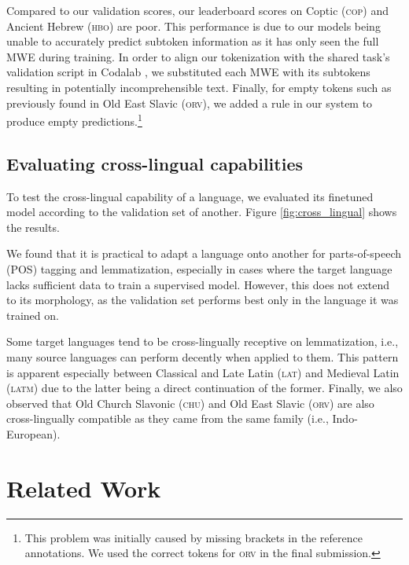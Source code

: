 \documentclass[11pt]{article}
\begin{document}
Compared to our validation scores, our leaderboard scores on Coptic (\textsc{cop}) and Ancient Hebrew (\textsc{hbo}) are poor.
This performance is due to our models being unable to accurately predict subtoken information as it has only seen the full MWE during training.
In order to align our tokenization with the shared task's validation script in Codalab \cite{pavao-etal-2023-codalab}, we substituted each MWE with its subtokens resulting in potentially incomprehensible text.
Finally, for empty tokens such as previously found in Old East Slavic (\textsc{orv}), we added a rule in our system to produce empty predictions.\footnote[1]{This problem was initially caused by missing brackets in the reference annotations. We used the correct tokens for \textsc{orv} in the final submission.}

\subsection{Evaluating cross-lingual capabilities}
\label{sec:results_crosslingual}

To test the cross-lingual capability of a language, we evaluated its finetuned model according to the validation set of another.
Figure \ref{fig:cross_lingual} shows the results.

We found that it is practical to adapt a language onto another for parts-of-speech (POS) tagging and lemmatization, especially in cases where the target language lacks sufficient data to train a supervised model.
However, this does not extend to its morphology, as the validation set performs best only in the language it was trained on.

Some target languages tend to be cross-lingually receptive on lemmatization, i.e., many source languages can perform decently when applied to them.
This pattern is apparent especially between Classical and Late Latin (\textsc{lat}) and Medieval Latin (\textsc{latm}) due to the latter being a direct continuation of the former.
Finally, we also observed that Old Church Slavonic (\textsc{chu}) and Old East Slavic (\textsc{orv}) are also cross-lingually compatible as they came from the same family (i.e., Indo-European).

\section{Related Work}
\end{document}
